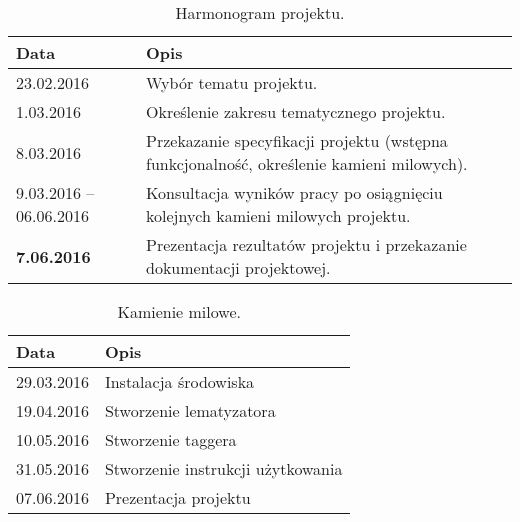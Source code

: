 \begin{table}[H]
	\centering
	\caption{Harmonogram projektu.}
	\smallskip
	\begin{tabular}{p{4cm}p{8cm}}
		\textbf{Data}& \textbf{Opis} \\\hline
		23.02.2016 & Wybór tematu projektu. \\\hline
		1.03.2016 & Określenie zakresu tematycznego projektu. \\\hline
		8.03.2016 & Przekazanie specyfikacji projektu (wstępna funkcjonalność, określenie kamieni milowych). \\\hline
		9.03.2016 -- 06.06.2016 & Konsultacja wyników pracy po osiągnięciu kolejnych kamieni milowych projektu. \\\hline
		\textbf{7.06.2016} & Prezentacja rezultatów projektu i przekazanie dokumentacji projektowej. \\\hline
	\end{tabular}
\end{table}

	\begin{table}[H]
	\centering
	\caption{Kamienie milowe.}
	\smallskip
	\begin{tabular}{p{4cm}p{8cm}}
		\textbf{Data}& \textbf{Opis} \\\hline
		29.03.2016 & Instalacja środowiska \\\hline
		19.04.2016 & Stworzenie lematyzatora \\\hline
		10.05.2016 & Stworzenie taggera \\\hline
		31.05.2016 & Stworzenie instrukcji użytkowania \\\hline
		07.06.2016 & Prezentacja projektu \\\hline		
	\end{tabular}
\end{table}